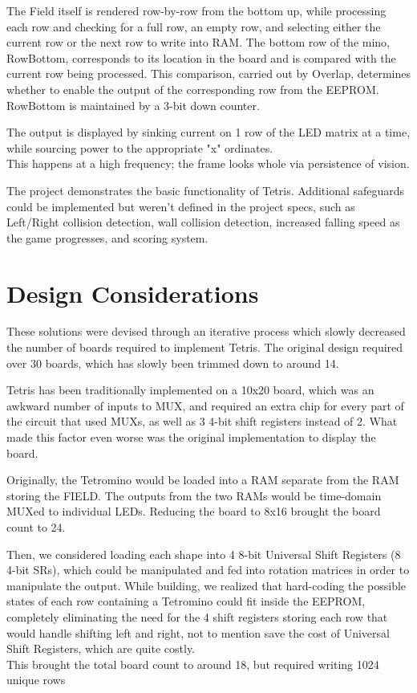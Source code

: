 \documentclass[letterpaper,titlepage,oneside]{article}
\begin{document}
The Field itself is rendered row-by-row from the bottom up, while processing each row and checking for a full row, an empty row, and selecting either the current row or the next row to write into RAM. The bottom row of the mino, RowBottom, corresponds to its location in the board and is compared with the current row being processed. This comparison, carried out by Overlap, determines whether to enable the output of the corresponding row from the EEPROM. RowBottom is maintained by a 3-bit down counter.

The output is displayed by sinking current on 1 row of the LED matrix at a time, while sourcing power to the appropriate "x" ordinates. \\
This happens at a high frequency; the frame looks whole via persistence of vision.

The project demonstrates the basic functionality of Tetris. Additional safeguards could be implemented but weren't defined in the project specs, such as Left/Right collision detection, wall collision detection, increased falling speed as the game progresses, and scoring system.
\pagebreak
\section{Design Considerations}

These solutions were devised through an iterative process which slowly decreased the number of boards required to implement Tetris. The original design required over 30 boards, which has slowly been trimmed down to around 14.

Tetris has been traditionally implemented on a 10x20 board, which was an awkward number of inputs to MUX, and required an extra chip for every part of the circuit that used MUXs, as well as 3 4-bit shift registers instead of 2. What made this factor even worse was the original implementation to display the board.

Originally, the Tetromino would be loaded into a RAM separate from the RAM storing the FIELD. The outputs from the two RAMs would be time-domain MUXed to individual LEDs. Reducing the board to 8x16 brought the board count to 24. 

Then, we considered loading each shape into 4 8-bit Universal Shift Registers (8 4-bit SRs), which could be manipulated and fed into rotation matrices in order to manipulate the output. While building, we realized that hard-coding the possible states of each row containing a Tetromino could fit inside the EEPROM, completely eliminating the need for the 4 shift registers storing each row that would handle shifting left and right, not to mention save the cost of Universal Shift Registers, which are quite costly. \\
This brought the total board count to around 18, but required writing 1024 unique rows
\end{document}
